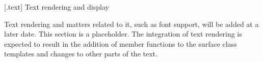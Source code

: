 
 [\iotwod.text] {Text rendering and display}

\pnum
\begin{note}
Text rendering and matters related to it, such as font support, will be added at a later date. This section is a placeholder. The integration of text rendering is expected to result in the addition of member functions to the surface class templates and changes to other parts of the text.
\end{note}
